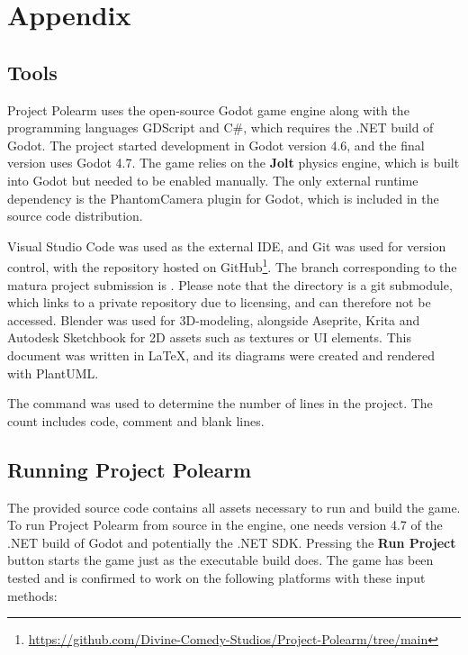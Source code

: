 \documentclass[../Main.tex]{subfiles}
\begin{document}
\section{Appendix}\label{sec:appendix}

\subsection{Tools}\label{sec:tools}

Project Polearm uses the open-source Godot game engine along with the programming languages GDScript and C\#, which requires the .NET build of Godot. The project started development in Godot version 4.6, and the final version uses Godot 4.7. The game relies on the \textbf{Jolt} physics engine, which is built into Godot but needed to be enabled manually. The only external runtime dependency is the PhantomCamera plugin for Godot, which is included in the source code distribution.

Visual Studio Code was used as the external IDE, and Git was used for version control, with the repository hosted on GitHub\footnote{\url{https://github.com/Divine-Comedy-Studios/Project-Polearm/tree/main}}. The branch corresponding to the matura project submission is . Please note that the  directory is a git submodule, which links to a private repository due to licensing, and can therefore not be accessed. Blender was used for 3D-modeling, alongside Aseprite, Krita and Autodesk Sketchbook for 2D assets such as textures or UI elements. This document was written in LaTeX, and its diagrams were created and rendered with PlantUML.

The command  was used to determine the number of lines in the project. The count includes code, comment and blank lines.

\subsection{Running Project Polearm}\label{sec:running-project-polearm}

The provided source code contains all assets necessary to run and build the game. To run Project Polearm from source in the engine, one needs version 4.7 of the .NET build of Godot and potentially the .NET SDK. Pressing the \textbf{Run Project} button starts the game just as the executable build does. The game has been tested and is confirmed to work on the following platforms with these input methods:
\end{document}

